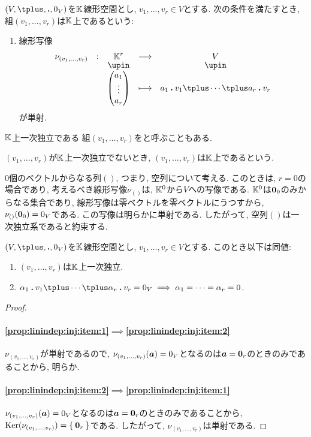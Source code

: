 \begin{definition}
  $(V,\plus,\act,0_V)$を$\mathbb{K}$線形空間とし,
  $v_1,\ldots,v_r\in V$とする.
  次の条件を満たすとき,
  組$(v_1,\ldots,v_r)$は$\mathbb{K}$上であるという:
\begin{enumerate}
  \item 線形写像
    \begin{align*}
      \shazo{\nu_{(v_1,\ldots,v_r)}}{\KK^r}{V}
      {\begin{pmatrix}a_1\\\vdots\\a_r\end{pmatrix}}{a_1\act v_1\plus\cdots\plus a_r\act v_r}
    \end{align*}
    が単射.
  \end{enumerate}
  $\mathbb{K}$上一次独立である
  組$(v_1,\ldots,v_r)$をと呼ぶこともある.
  
  $(v_1,\ldots,v_r)$が$\mathbb{K}$上一次独立でないとき,
  $(v_1,\ldots,v_r)$は$\mathbb{K}$上であるという.
\end{definition}
\begin{remark}
$0$個のベクトルからなる列$()$, つまり, 空列について考える.
このときは, $r=0$の場合であり, 考えるべき線形写像$\nu_{()}$は,
$\mathbb{K}^0$から$V$への写像である.
$\mathbb{K}^0$は$\boldsymbol{0}_0$のみからなる集合であり,
線形写像は零ベクトルを零ベクトルにうつすから,
$\nu_{()}(\boldsymbol{0}_0)=0_V$である.
この写像は明らかに単射である.
したがって,
空列$()$は一次独立系であると約束する.
\end{remark}
\begin{prop}
  $(V,\plus,\act,0_V)$を$\mathbb{K}$線形空間とし,
  $v_1,\ldots,v_r\in V$とする.
  このとき以下は同値:
  \begin{enumerate}
  \item
  \label{prop:linindep:inj:item:1}
  $(v_1,\ldots,v_r)$は$\mathbb{K}$上一次独立.
  \item
  \label{prop:linindep:inj:item:2}
  $\alpha_1\act v_1\plus\cdots\plus \alpha_r\act v_r=0_V \implies \alpha_1=\cdots=\alpha_r=0$.
  \end{enumerate}
\end{prop}
\begin{proof}
\paragraph{\ref{prop:linindep:inj:item:1}$\implies$\ref{prop:linindep:inj:item:2}}
$\nu_{(v_1,\ldots,v_r)}$が単射であるので,
$\nu_{(v_1,\ldots,v_r)}(\boldsymbol{a})=0_V$となるのは$\boldsymbol{a}=\boldsymbol{0}_r$のときのみであることから,
明らか.

\paragraph{\ref{prop:linindep:inj:item:2}$\implies$\ref{prop:linindep:inj:item:1}}
$\nu_{(v_1,\ldots,v_r)}(\boldsymbol{a})=0_V$となるのは$\boldsymbol{a}=\boldsymbol{0}_r$のときのみであることから, $\operatorname{Ker}(\nu_{(v_1,\ldots,v_r)})=\Set{\boldsymbol{0}_r}$である.
したがって, $\nu_{(v_1,\ldots,v_r)}$は単射である.

\end{proof}
